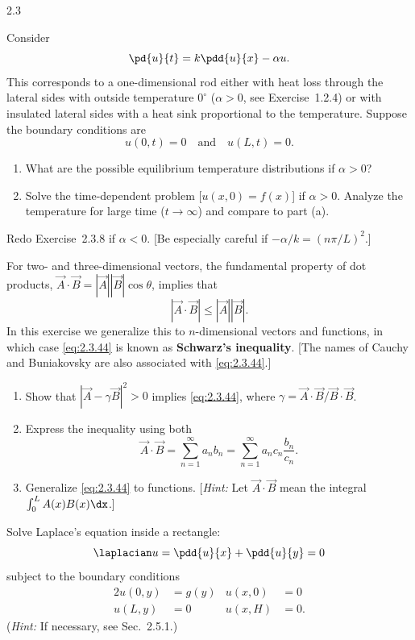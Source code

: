 \begin{exercises}{2.3}
\item\starred{} Consider
\[
\pd{u}{t} = k\pdd{u}{x} - \alpha u.
\]
This corresponds to a one-dimensional rod either with heat loss through the lateral sides with outside temperature $0^\circ$ ($\alpha > 0$, see Exercise~1.2.4) or with insulated lateral sides with a heat sink proportional to the temperature. Suppose the boundary conditions are
\[
u(0,t) = 0 \quad\text{and}\quad u(L,t) = 0.
\]
\begin{enumerate}
\item[(a)] What are the possible equilibrium temperature distributions if $\alpha > 0$?
\item[(b)] Solve the time-dependent problem [$u(x,0) = f(x)$] if $\alpha > 0$. Analyze the temperature for large time ($t\to\infty$) and compare to part (a).
\end{enumerate}

\item\starred{} Redo Exercise~2.3.8 if $\alpha < 0$. [Be especially careful if $-\alpha/k = (n\pi/L)^2$.]

\item For two- and three-dimensional vectors, the fundamental property of dot products, $\vec{A}\cdot\vec{B} = |\vec{A}||\vec{B}|\cos\theta$, implies that
\begin{equation}
\label{eq:2.3.44}
|\vec{A}\cdot\vec{B}| \le |\vec{A}||\vec{B}|.
\end{equation}
In this exercise we generalize this to $n$-dimensional vectors and functions, in which case \eqref{eq:2.3.44} is known as \textbf{Schwarz's inequality}. [The names of Cauchy and Buniakovsky are also associated with \eqref{eq:2.3.44}.]
\begin{enumerate}
\item[(a)] Show that $|\vec{A} - \gamma\vec{B}|^2 > 0$ implies \eqref{eq:2.3.44}, where $\gamma = \vec{A}\cdot\vec{B}/\vec{B}\cdot\vec{B}$.
\item[(b)] Express the inequality using both
\[
\vec{A}\cdot\vec{B} = \sum_{n=1}^{\infty} a_n b_n = \sum_{n=1}^{\infty} a_n c_n\frac{b_n}{c_n}.
\]
\item[\starred(c)] Generalize \eqref{eq:2.3.44} to functions. [\emph{Hint:} Let $\vec{A}\cdot\vec{B}$ mean the integral $\int_0^L A(x)B(x)\dx$.]
\end{enumerate}

\item Solve Laplace's equation inside a rectangle:
\[
\laplacian u = \pdd{u}{x} + \pdd{u}{y} = 0
\]
subject to the boundary conditions
\begin{alignat*}{2}
u(0,y) &= g(y) & u(x,0) &= 0 \\
u(L,y) &= 0 \qquad & u(x,H) &= 0.
\end{alignat*}
(\emph{Hint:} If necessary, see Sec.~2.5.1.)

\end{exercises}
